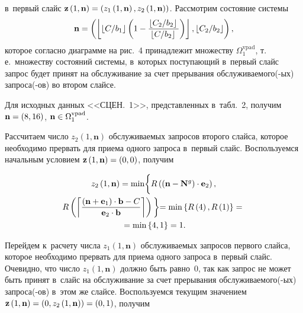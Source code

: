 \begin{multicols}{2}
\noindent
 в~первый слайс
$\mathbf{z}\left(1,\mathbf{n}\right)\hm=\left(z_1\left(1,\mathbf{n}\right), 
z_2\left(1,\mathbf{n}\right)\right)$.
Рас\-смот\-рим со\-сто\-яние сис\-те\-мы
$$
\mathbf{n} = \left(\left\lfloor \left\lfloor C/b_1 \right\rfloor \left(1-
\displaystyle\frac{\displaystyle \left\lfloor C_2/b_2 \right\rfloor\mathstrut}{\displaystyle \left\lfloor C/b_2 \right\rfloor\mathstrut} 
\right) \right\rfloor, \left\lfloor C_2/b_2 \right\rfloor \right),
$$
которое согласно диаграмме на рис.~4 принадлежит множеству 
$\Omega_1^{\mathrm{vpad}}$, т.\,е.\ множеству со\-сто\-яний сис\-те\-мы, в~которых 
поступающий в~первый слайс запрос
 будет принят на обслуживание за счет 
прерывания об\-слу\-жи\-ва\-емо\-го(-ых) за\-про\-са(-ов) во втором \mbox{слайсе}.

Для исходных данных <<СЦЕН.~1>>, пред\-став\-лен\-ных 
в~табл.~2, получим $\mathbf{n}\hm = \left(8,16\right)$, 
$\mathbf{n}\hm\in\Omega_1^{\mathrm{vpad}}$.


Рассчитаем число $z_2\left(1,\mathbf{n}\right)$ об\-слу\-жи\-ва\-емых запросов 
второго слайса, которое необходимо прервать для приема одного запроса в~первый 
слайс. Воспользуемся начальным условием 
$\mathbf{z}\left(1,\mathbf{n}\right)\hm=\left(0,0\right)$, получим

\noindent
\begin{multline*}
z_2\left(1,\mathbf{n}\right) = \min
\biggl\{
R \left(\left(\mathbf{n}-\mathbf{N}^{{g}}\right) \cdot \mathbf{e}_2\right), 
\\
R \left(\left\lceil \displaystyle\frac{\displaystyle \left(\mathbf{n}+\mathbf{e}_1 \right)\cdot\mathbf{b} - 
C\mathstrut}{\displaystyle \mathbf{e}_2\cdot\mathbf{b}\mathstrut} \right\rceil\right)
\biggl\} =
\min \left\{ R \left(4\right),R \left(1\right) \right\} = {}\\
{}= \min \left\{4,1\right\} = 1.
\end{multline*}

Перейдем к~расчету числа $z_1\left(1,\mathbf{n}\right)$ об\-слу\-жи\-ва\-емых 
запросов первого слайса, которое необходимо прервать для приема одного запроса в~первый слайс. Очевидно, что число $z_1\left(1,\mathbf{n}\right)$ должно 
быть равно~$0$, так как запрос не может быть принят в~слайс на обслуживание за 
счет прерывания об\-слу\-жи\-ва\-емо\-\mbox{го(-ых)} за\-про\-са(-ов) в~этом же слайсе. 
Воспользуемся текущим значением 
$\mathbf{z}\left(1,\mathbf{n}\right)\hm=\left(0,z_2\left(1,\mathbf{n}\right)\right)
=\left(0,1\right)$, получим

\vspace*{-6pt}


\end{multicols}
